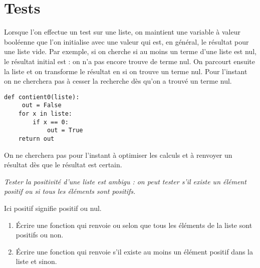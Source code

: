 \section{Tests} 
Lorsque l'on effectue un test sur une liste, on maintient une variable à valeur booléenne que l'on initialise avec une valeur qui est, en général, le résultat pour une liste vide. Par exemple, si on cherche si au moins un terme d'une liste est nul, le résultat initial est  : on n'a pas encore trouve de terme nul. On parcourt ensuite la liste et on transforme le résultat en  si on trouve un terme nul. Pour l'instant on ne cherchera pas à cesser la recherche dès qu'on a trouvé un terme nul.
\begin{lstlisting}
def contient0(liste):
     out = False
    for x in liste:
        if x == 0:
            out = True
    return out
\end{lstlisting}
On ne cherchera pas pour l'instant à optimiser les calculs et à renvoyer un résultat dès que le résultat est certain.
\begin{Exercise}[title=Positivité]\it
Tester la positivité d'une liste est ambigu : on peut tester s'il existe un élément positif ou si tous les éléments sont positifs.

Ici positif signifie positif ou nul.
\begin{enumerate}
    \item Écrire une fonction  qui renvoie  ou  selon que tous les éléments de la liste sont positifs ou non.
    \item Écrire une fonction  qui renvoie  s'il existe au moins un élément positif dans la liste et  sinon.
\end{enumerate}
\end{Exercise}
